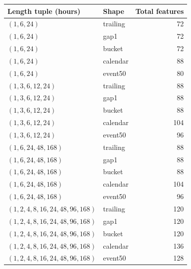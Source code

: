 \begin{tabular}{llr}
\toprule
Length tuple (hours) & Shape & Total features \\
\midrule
$(1, 6, 24)$ & trailing & 72 \\
$(1, 6, 24)$ & gap1 & 72 \\
$(1, 6, 24)$ & bucket & 72 \\
$(1, 6, 24)$ & calendar & 88 \\
$(1, 6, 24)$ & event50 & 80 \\
$(1, 3, 6, 12, 24)$ & trailing & 88 \\
$(1, 3, 6, 12, 24)$ & gap1 & 88 \\
$(1, 3, 6, 12, 24)$ & bucket & 88 \\
$(1, 3, 6, 12, 24)$ & calendar & 104 \\
$(1, 3, 6, 12, 24)$ & event50 & 96 \\
$(1, 6, 24, 48, 168)$ & trailing & 88 \\
$(1, 6, 24, 48, 168)$ & gap1 & 88 \\
$(1, 6, 24, 48, 168)$ & bucket & 88 \\
$(1, 6, 24, 48, 168)$ & calendar & 104 \\
$(1, 6, 24, 48, 168)$ & event50 & 96 \\
$(1, 2, 4, 8, 16, 24, 48, 96, 168)$ & trailing & 120 \\
$(1, 2, 4, 8, 16, 24, 48, 96, 168)$ & gap1 & 120 \\
$(1, 2, 4, 8, 16, 24, 48, 96, 168)$ & bucket & 120 \\
$(1, 2, 4, 8, 16, 24, 48, 96, 168)$ & calendar & 136 \\
$(1, 2, 4, 8, 16, 24, 48, 96, 168)$ & event50 & 128 \\
\bottomrule
\end{tabular}
